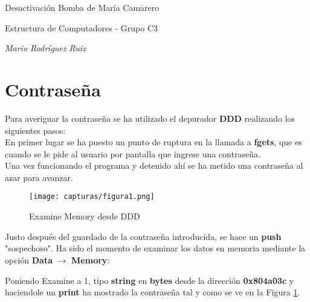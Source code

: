 





	
{\LARGE Desactivación Bomba de María Camarero \par}
\vspace{5mm}
{\large Estructura de Computadores - Grupo C3 \par}
\vspace{3mm}
{\large \textit{Mario Rodríguez Ruiz} \par}	
	
	

\section{Contraseña}

Para averiguar la contraseña se ha utilizado el depurador \textbf{DDD} realizando los siguientes pasos:
\\

En primer lugar se ha puesto un punto de ruptura en la llamada a \textbf{fgets}, que es cuando se le pide al usuario por pantalla que ingrese una contraseña.\\

Una vez funcionando el programa y detenido ahí se ha metido una contraseña al azar para avanzar.

\begin{figure}[H]
	\centering
	\texttt{[image: capturas/figura1.png]} 
	\caption{Examine Memory desde DDD} 
	\label{fig:figura1}
\end{figure}

Justo después del guardado de la contraseña introducida, se hace un \textbf{push} "sospechoso".
Ha sido el momento de examinar los datos en memoria mediante la opción \textbf{Data} $ \rightarrow $ \textbf{Memory}:

Poniendo Examine a 1, tipo \textbf{string} en \textbf{bytes} desde la dirección \textbf{0x804a03c} y haciendole un \textbf{print} ha mostrado la contraseña tal y como se ve en la Figura \ref{fig:figura1}.
\\

